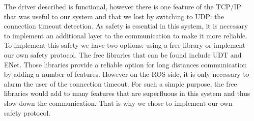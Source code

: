 







The driver described is functional, however there is one feature of the TCP/IP that was useful to our system and that we lost by switching to UDP: the connection timeout detection. As safety is essential in this system, it is necessary to implement an additional layer to the communication to make it more reliable. To implement this safety we have two options: using a free library or implement our own safety protocol. The free libraries that can be found include UDT\cite{UDT}  and ENet\cite{ENet}. Those libraries provide a reliable option for long distances communication by adding a number of features. However on the ROS side, it is only necessary to alarm the user of the connection timeout. For such a simple purpose, the free libraries would add to many features that are superfluous in this system and thus slow down the communication. That is why we chose to implement our own safety protocol.

